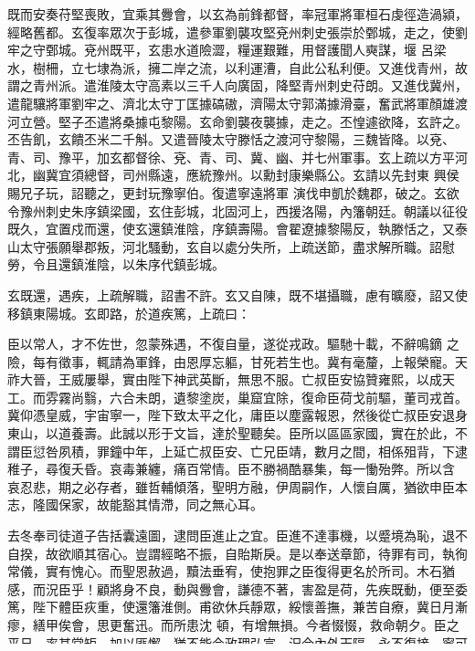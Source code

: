 \begin{pinyinscope}
既而安奏苻堅喪敗，宜乘其釁會，以玄為前鋒都督，率冠軍將軍桓石虔徑造渦潁，經略舊都。玄復率眾次于彭城，遣參軍劉襲攻堅兗州刺史張崇於鄄城，走之，使劉牢之守鄄城。兗州既平，玄患水道險澀，糧運艱難，用督護聞人奭謀，堰
 呂梁水，樹柵，立七埭為派，擁二岸之流，以利運漕，自此公私利便。又進伐青州，故謂之青州派。遣淮陵太守高素以三千人向廣固，降堅青州刺史苻朗。又進伐冀州，遣龍驤將軍劉牢之、濟北太守丁匡據碻磝，濟陽太守郭滿據滑臺，奮武將軍顏雄渡河立營。堅子丕遣將桑據屯黎陽。玄命劉襲夜襲據，走之。丕惶遽欲降，玄許之。丕告飢，玄饋丕米二千斛。又遣晉陵太守滕恬之渡河守黎陽，三魏皆降。以兗、青、司、豫平，加玄都督徐、兗、青、司、冀、幽、并七州軍事。玄上疏以方平河北，幽冀宜須總督，司州縣遠，應統豫州。以勳封康樂縣公。玄請以先封東
 興侯賜兄子玩，詔聽之，更封玩豫寧伯。復遣寧遠將軍
 演伐申凱於魏郡，破之。玄欲令豫州刺史朱序鎮梁國，玄住彭城，北固河上，西援洛陽，內籓朝廷。朝議以征役既久，宜置戍而還，使玄還鎮淮陰，序鎮壽陽。會翟遼據黎陽反，執滕恬之，又泰山太守張願舉郡叛，河北騷動，玄自以處分失所，上疏送節，盡求解所職。詔慰勞，令且還鎮淮陰，以朱序代鎮彭城。



 玄既還，遇疾，上疏解職，詔書不許。玄又自陳，既不堪攝職，慮有曠廢，詔又使移鎮東陽城。玄即路，於道疾篤，上疏曰：



 臣以常人，才不佐世，忽蒙殊遇，不復自量，遂從戎政。驅馳十載，不辭鳴鏑
 之險，每有徵事，輒請為軍鋒，由恩厚忘軀，甘死若生也。冀有毫釐，上報榮寵。天祚大晉，王威屢舉，實由陛下神武英斷，無思不服。亡叔臣安協贊雍熙，以成天工。而雰霧尚翳，六合未朗，遺黎塗炭，巢窟宜除，復命臣荷戈前驅，董司戎首。冀仰憑皇威，宇宙寧一，陛下致太平之化，庸臣以塵露報恩，然後從亡叔臣安退身東山，以道養壽。此誠以形于文旨，達於聖聽矣。臣所以區區家國，實在於此，不謂臣愆咎夙積，罪鐘中年，上延亡叔臣安、亡兄臣靖，數月之間，相係殂背，下逮稚子，尋復夭昏。哀毒兼纏，痛百常情。臣不勝禍酷暴集，每一慟殆弊。所以含
 哀忍悲，期之必存者，雖哲輔傾落，聖明方融，伊周嗣作，人懷自厲，猶欲申臣本志，隆國保家，故能豁其情滯，同之無心耳。



 去冬奉司徒道子告括囊遠圖，逮問臣進止之宜。臣進不達事機，以蹙境為恥，退不自揆，故欲順其宿心。豈謂經略不振，自貽斯戾。是以奉送章節，待罪有司，執徇常儀，實有愧心。而聖恩赦過，黷法垂宥，使抱罪之臣復得更名於所司。木石猶感，而況臣乎！顧將身不良，動與釁會，謙德不著，害盈是荷，先疾既動，便至委篤，陛下體臣疢重，使還籓淮側。甫欲休兵靜眾，綏懷善撫，兼苦自療，冀日月漸瘳，繕甲俟會，思更奮迅。而所患沈
 頓，有增無損。今者惙惙，救命朝夕。臣之平日，率其常矩，加以匪懈，猶不能令政理弘宣，況今內外天隔，永不復接，寧可臥居重任，以招患慮。




\end{pinyinscope}
